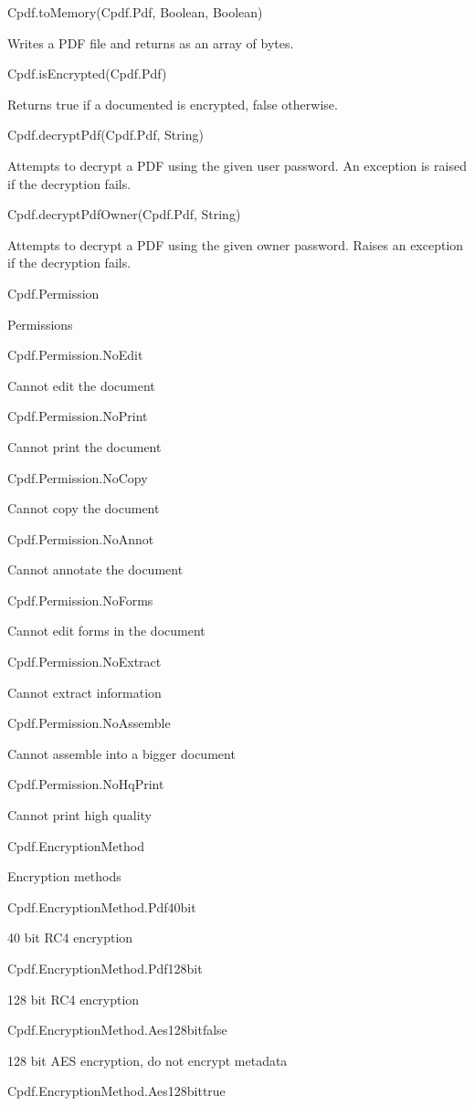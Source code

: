 Cpdf.toMemory(Cpdf.Pdf, Boolean, Boolean)


Writes a PDF file 
and returns as an array of bytes.


Cpdf.isEncrypted(Cpdf.Pdf)


Returns true if a documented is encrypted, false
otherwise.


Cpdf.decryptPdf(Cpdf.Pdf, String)


Attempts to decrypt a PDF using the given
user password. An exception is raised if the decryption fails.


Cpdf.decryptPdfOwner(Cpdf.Pdf, String)


Attempts to decrypt a PDF using the
given owner password. Raises an exception if the decryption fails.


Cpdf.Permission

Permissions

Cpdf.Permission.NoEdit

Cannot edit the document

Cpdf.Permission.NoPrint

Cannot print the document

Cpdf.Permission.NoCopy

Cannot copy the document

Cpdf.Permission.NoAnnot

Cannot annotate the document

Cpdf.Permission.NoForms

Cannot edit forms in the document

Cpdf.Permission.NoExtract

Cannot extract information

Cpdf.Permission.NoAssemble

Cannot assemble into a bigger document

Cpdf.Permission.NoHqPrint

Cannot print high quality

Cpdf.EncryptionMethod

Encryption methods

Cpdf.EncryptionMethod.Pdf40bit

40 bit RC4 encryption

Cpdf.EncryptionMethod.Pdf128bit

128 bit RC4 encryption

Cpdf.EncryptionMethod.Aes128bitfalse

128 bit AES encryption, do not encrypt metadata

Cpdf.EncryptionMethod.Aes128bittrue

